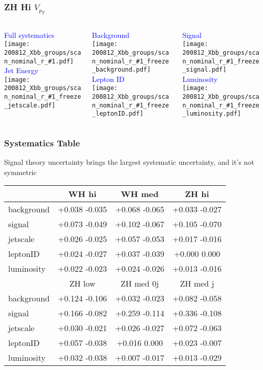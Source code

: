 \documentclass{beamer}
\newcommand{\beginbackup}{
  \newcounter{framenumbervorappendix}
  \setcounter{framenumbervorappendix}{\value{framenumber}}
}
\newcommand{\backupend}{
  \addtocounter{framenumbervorappendix}{-\value{framenumber}}
  \addtocounter{framenumber}{\value{framenumbervorappendix}}
}
\newcommand{\groupfigs}[1]{
  \begin{columns}
    \begin{column}{0.3\linewidth}
      \centering
      \textcolor{blue}{Full systematics} \\
      \texttt{[image: 200812\_Xbb\_groups/scan\_nominal\_r\_\#1.pdf]} \\
      \textcolor{blue}{Jet Energy} \\
      \texttt{[image: 200812\_Xbb\_groups/scan\_nominal\_r\_\#1\_freeze\_jetscale.pdf]}
    \end{column}
    \begin{column}{0.3\linewidth}
      \centering
      \textcolor{blue}{Background} \\
      \texttt{[image: 200812\_Xbb\_groups/scan\_nominal\_r\_\#1\_freeze\_background.pdf]} \\
      \textcolor{blue}{Lepton ID} \\
      \texttt{[image: 200812\_Xbb\_groups/scan\_nominal\_r\_\#1\_freeze\_leptonID.pdf]}
    \end{column}
    \begin{column}{0.3\linewidth}
      \centering
      \textcolor{blue}{Signal} \\
      \texttt{[image: 200812\_Xbb\_groups/scan\_nominal\_r\_\#1\_freeze\_signal.pdf]} \\
      \textcolor{blue}{Luminosity} \\
      \texttt{[image: 200812\_Xbb\_groups/scan\_nominal\_r\_\#1\_freeze\_luminosity.pdf]}
    \end{column}
  \end{columns}
}
\begin{document}
\begin{frame}
  \frametitle{ZH Hi $V_{p_T}$}

  \groupfigs{zhhi}

\end{frame}

\begin{frame}
  \frametitle{Systematics Table}

  Signal theory uncertainty brings the largest systematic uncertainty,
  and it's not symmetric

  \vfill

  \centering
  {
  \begin{tabular}{|l|c c c|}
    \hline
    & WH hi & WH med & ZH hi \\
    \hline
    background & +0.038  -0.035 & +0.068  -0.065 & +0.033  -0.027 \\
    signal & +0.073  -0.049 & +0.102  -0.067 & +0.105  -0.070 \\
    \hline
    jetscale & +0.026  -0.025 & +0.057  -0.053 & +0.017  -0.016 \\
    leptonID & +0.024  -0.027 & +0.037  -0.039 & +0.000  0.000 \\
    luminosity & +0.022  -0.023 & +0.024  -0.026 & +0.013  -0.016 \\
    \hline
    \hline
    & ZH low & ZH med 0j & ZH med j \\
    \hline
    background & +0.124  -0.106 & +0.032  -0.023 & +0.082  -0.058\\
    signal & +0.166  -0.082 & +0.259  -0.114 & +0.336  -0.108\\
    \hline
    jetscale & +0.030  -0.021 & +0.026  -0.027 & +0.072  -0.063\\
    leptonID & +0.057  -0.038 & +0.016  0.000 & +0.023  -0.007\\
    luminosity & +0.032  -0.038 & +0.007  -0.017 & +0.013  -0.029\\
    \hline
  \end{tabular}
  }

\end{frame}

\begin{comment}
\beginbackup

\begin{frame}
  \centering
    {\Huge \bf\sffamily Backup Slides}
\end{frame}



\backupend
\end{comment}
\end{document}
